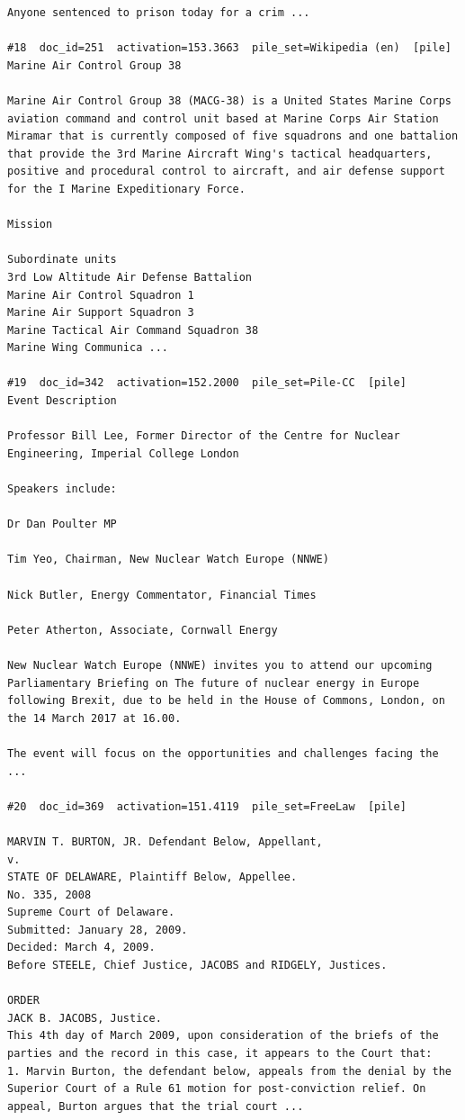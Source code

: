 \begin{verbatim}
Anyone sentenced to prison today for a crim ...

#18  doc_id=251  activation=153.3663  pile_set=Wikipedia (en)  [pile]
Marine Air Control Group 38

Marine Air Control Group 38 (MACG-38) is a United States Marine Corps aviation command and control unit based at Marine Corps Air Station Miramar that is currently composed of five squadrons and one battalion that provide the 3rd Marine Aircraft Wing's tactical headquarters, positive and procedural control to aircraft, and air defense support for the I Marine Expeditionary Force.

Mission

Subordinate units
3rd Low Altitude Air Defense Battalion
Marine Air Control Squadron 1
Marine Air Support Squadron 3
Marine Tactical Air Command Squadron 38
Marine Wing Communica ...

#19  doc_id=342  activation=152.2000  pile_set=Pile-CC  [pile]
Event Description

Professor Bill Lee, Former Director of the Centre for Nuclear Engineering, Imperial College London

Speakers include:

Dr Dan Poulter MP

Tim Yeo, Chairman, New Nuclear Watch Europe (NNWE)

Nick Butler, Energy Commentator, Financial Times

Peter Atherton, Associate, Cornwall Energy

New Nuclear Watch Europe (NNWE) invites you to attend our upcoming Parliamentary Briefing on The future of nuclear energy in Europe following Brexit, due to be held in the House of Commons, London, on the 14 March 2017 at 16.00.

The event will focus on the opportunities and challenges facing the ...

#20  doc_id=369  activation=151.4119  pile_set=FreeLaw  [pile]

MARVIN T. BURTON, JR. Defendant Below, Appellant,
v.
STATE OF DELAWARE, Plaintiff Below, Appellee.
No. 335, 2008
Supreme Court of Delaware.
Submitted: January 28, 2009.
Decided: March 4, 2009.
Before STEELE, Chief Justice, JACOBS and RIDGELY, Justices.

ORDER
JACK B. JACOBS, Justice.
This 4th day of March 2009, upon consideration of the briefs of the parties and the record in this case, it appears to the Court that:
1. Marvin Burton, the defendant below, appeals from the denial by the Superior Court of a Rule 61 motion for post-conviction relief. On appeal, Burton argues that the trial court ...

\end{verbatim}

